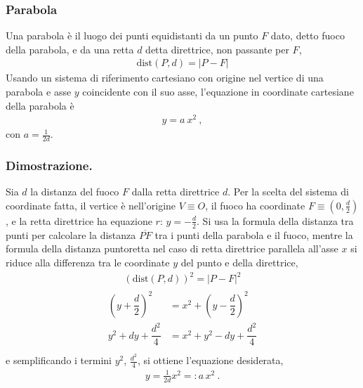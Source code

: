 \documentclass[letterpaper,10pt,italian]{jupyterBook}
\begin{document}
\subsubsection{Parabola}
\label{\detokenize{ch/analytic_geometry/analytic_geometry_2d/conics-cartesian:parabola}}
\sphinxAtStartPar
Una parabola è il luogo dei punti equidistanti da un punto \(F\) dato, detto fuoco della parabola, e da una retta \(d\) detta direttrice, non passante per \(F\),
\begin{equation*}
\begin{split}\text{dist}(P,d) = |P - F|\end{split}
\end{equation*}
\sphinxAtStartPar
Usando un sistema di riferimento cartesiano con origine nel vertice di una parabola e asse \(y\) coincidente con il suo asse, l’equazione in coordinate cartesiane della parabola è
\begin{equation*}
\begin{split}y = a \ x^2 \ ,\end{split}
\end{equation*}
\sphinxAtStartPar
con \(a = \frac{1}{2 d}\).
\subsubsection*{Dimostrazione.}

\sphinxAtStartPar
{}
Sia \(d\) la distanza del fuoco \(F\) dalla retta direttrice \(d\). Per la scelta del sistema di coordinate fatta, il vertice è nell’origine \(V \equiv O\), il fuoco ha coordinate \(F \equiv \left(0, \frac{d}{2} \right)\), e la retta direttrice ha equazione \(r: \, y = - \frac{d}{2}\).
Si usa la formula della distanza tra punti per calcolare la distanza \(\overline{PF}\) tra i punti della parabola e il fuoco, mentre la formula della distanza punto\sphinxhyphen{}retta nel caso di retta direttrice parallela all’asse \(x\) si riduce alla differenza tra le coordinate \(y\) del punto e della direttrice,
\begin{equation*}
\begin{split}\left( \text{dist}(P,d) \right)^2 = |P-F|^2\end{split}
\end{equation*}\begin{equation*}
\begin{split}\begin{aligned}
  \left(y+\dfrac{d}{2}\right)^2 & = x^2 + \left(y-\dfrac{d}{2}\right)^2 \\
  y^2 + d y + \dfrac{d^2}{4}    & = x^2 + y^2 - d y + \dfrac{d^2}{4}    \\
\end{aligned}\end{split}
\end{equation*}
\sphinxAtStartPar
e semplificando i termini \(y^2\), \(\frac{d^2}{4}\), si ottiene l’equazione desiderata,
\begin{equation*}
\begin{split}y = \frac{1}{2 d} x^2 =: a \, x^2 \ .\end{split}
\end{equation*}
\end{document}
